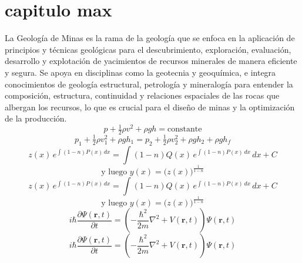 \section{capitulo max}
La Geología de Minas es la rama de la geología que se enfoca en la aplicación de principios y técnicas geológicas para el descubrimiento, exploración, evaluación, desarrollo y explotación de yacimientos de recursos minerales de manera eficiente y segura. Se apoya en disciplinas como la geotecnia y geoquímica, e integra conocimientos de geología estructural, petrología y mineralogía para entender la composición, estructura, continuidad y relaciones espaciales de las rocas que albergan los recursos, lo que es crucial para el diseño de minas y la optimización de la producción. 
\[
p + \tfrac{1}{2}\rho v^{2} + \rho g h = \text{constante}
\]
\[
p_1 + \tfrac{1}{2}\rho v_1^{2} + \rho g h_1
=
p_2 + \tfrac{1}{2}\rho v_2^{2} + \rho g h_2 + \rho g h_f
\]
\[
z(x) \, e^{\int (1-n)P(x)\,dx}
=
\int (1-n)Q(x)\, e^{\int (1-n)P(x)\,dx}\,dx + C
\]
\[
\text{y luego } y(x) = \bigl(z(x)\bigr)^{\frac{1}{1-n}}
\]
\[
z(x) \, e^{\int (1-n)P(x)\,dx}
=
\int (1-n)Q(x)\, e^{\int (1-n)P(x)\,dx}\,dx + C
\]
\[
\text{y luego } y(x) = \bigl(z(x)\bigr)^{\frac{1}{1-n}}
\]
\[
i\hbar \frac{\partial \Psi(\mathbf{r},t)}{\partial t}
=
\left(
-\frac{\hbar^{2}}{2m}\nabla^{2} + V(\mathbf{r},t)
\right)\Psi(\mathbf{r},t)
\]
\[
i\hbar \frac{\partial \Psi(\mathbf{r},t)}{\partial t}
=
\left(
-\frac{\hbar^{2}}{2m}\nabla^{2} + V(\mathbf{r},t)
\right)\Psi(\mathbf{r},t)
\]
